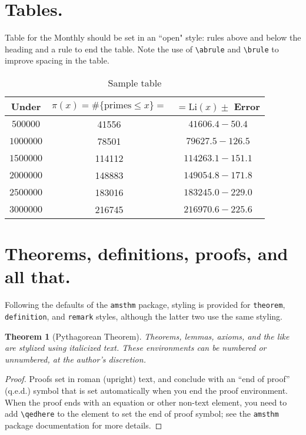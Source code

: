 \documentclass{article}
\theoremstyle{theorem}
\newtheorem{theorem}{Theorem}
\theoremstyle{definition}
\begin{document}
\section{Tables.}

Table for the  {\sc Monthly} should be set in an ``open" style: rules above and below the heading and a rule to end the table.  Note the use of \verb~\abrule~ and \verb~\brule~ to improve spacing in the table.

\begin{table}[h]
\caption{Sample table}
\begin{center}
\begin{tabular}{ccc}
\hline
Under  & $\pi(x) = \#\{\text{primes} \le x\}=$ &   $=\text{Li}(x)\pm$  Error\abrule\\
\hline
$500000$  &  41556 &  $41606.4 - 50.4$ \abrule \\
$1000000$ &  78501 &  $79627.5 - 126.5$\brule \\
$1500000$ & 114112 & $114263.1 - 151.1$\brule \\
$2000000$ & 148883 & $149054.8 - 171.8$\brule \\
$2500000$ & 183016 & $183245.0 - 229.0$\brule \\
$3000000$ & 216745 & $216970.6 - 225.6 $\brule \\
\hline
\end{tabular}
\end{center}
\end{table}


\section{Theorems, definitions, proofs, and all that.}

Following the defaults of the \texttt{amsthm} package, styling is provided for \texttt{theorem}, \texttt{definition}, and \texttt{remark} styles, although the latter two use the same styling.

\begin{theorem}[Pythagorean Theorem]
Theorems, lemmas, axioms, and the like are stylized using italicized text. These environments can be numbered or unnumbered, at the author's discretion.
\end{theorem}

\begin{proof}
Proofs set in roman (upright) text, and conclude with an ``end of proof'' (q.e.d.) symbol that is set automatically when you end the proof environment.  When the proof ends with an equation or other non-text element, you need to add \verb~\qedhere~ to the element to set the end of proof symbol; see the \texttt{amsthm} package documentation for more details.
\end{proof}
\end{document}
